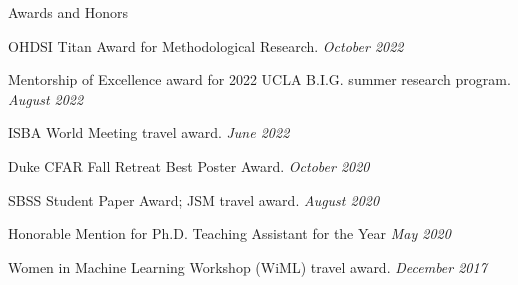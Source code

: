 \documentclass{resume} %
\begin{document}
\begin{rSection}{Awards and Honors}

OHDSI Titan Award for Methodological Research. 
\hfill {\em October 2022}

Mentorship of Excellence award for 2022 UCLA B.I.G. summer research program. \hfill {\em August 2022}

ISBA World Meeting travel award.
\hfill {\em June 2022}

Duke CFAR Fall Retreat Best Poster Award. 
\hfill {\em October 2020}

SBSS Student Paper Award; JSM travel award. \hfill {\em August 2020}

Honorable Mention for Ph.D. Teaching Assistant for the Year
\hfill {\em May 2020}

Women in Machine Learning Workshop (WiML) travel award. \hfill {\em December 2017}

\end{rSection}
\end{document}
